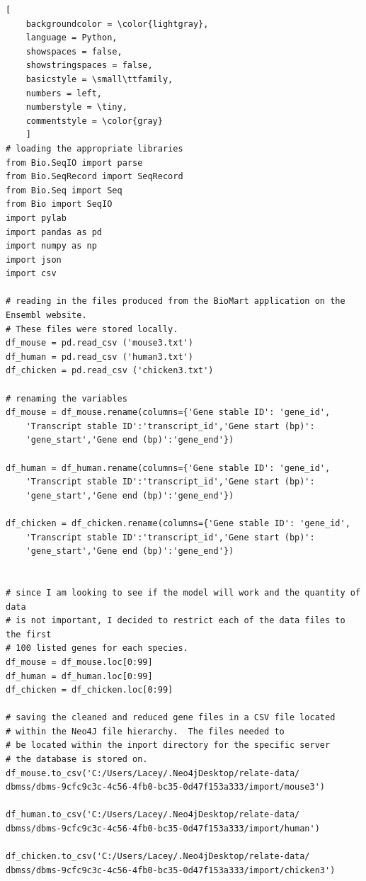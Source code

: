 \documentclass[]{article}
\begin{document}
\begin{lstlisting}[
	backgroundcolor = \color{lightgray},
	language = Python,
	showspaces = false,
	showstringspaces = false,
	basicstyle = \small\ttfamily,
	numbers = left,
	numberstyle = \tiny,
	commentstyle = \color{gray}
	]
# loading the appropriate libraries
from Bio.SeqIO import parse 
from Bio.SeqRecord import SeqRecord 
from Bio.Seq import Seq 
from Bio import SeqIO
import pylab
import pandas as pd
import numpy as np
import json
import csv 

# reading in the files produced from the BioMart application on the Ensembl website.
# These files were stored locally.
df_mouse = pd.read_csv ('mouse3.txt')
df_human = pd.read_csv ('human3.txt')
df_chicken = pd.read_csv ('chicken3.txt')

# renaming the variables 
df_mouse = df_mouse.rename(columns={'Gene stable ID': 'gene_id', 
	'Transcript stable ID':'transcript_id','Gene start (bp)':
	'gene_start','Gene end (bp)':'gene_end'})

df_human = df_human.rename(columns={'Gene stable ID': 'gene_id', 
	'Transcript stable ID':'transcript_id','Gene start (bp)':
	'gene_start','Gene end (bp)':'gene_end'})

df_chicken = df_chicken.rename(columns={'Gene stable ID': 'gene_id', 
	'Transcript stable ID':'transcript_id','Gene start (bp)':
	'gene_start','Gene end (bp)':'gene_end'})


# since I am looking to see if the model will work and the quantity of data 
# is not important, I decided to restrict each of the data files to the first
# 100 listed genes for each species.
df_mouse = df_mouse.loc[0:99]
df_human = df_human.loc[0:99]
df_chicken = df_chicken.loc[0:99]

# saving the cleaned and reduced gene files in a CSV file located
# within the Neo4J file hierarchy.  The files needed to
# be located within the inport directory for the specific server
# the database is stored on.
df_mouse.to_csv('C:/Users/Lacey/.Neo4jDesktop/relate-data/
dbmss/dbms-9cfc9c3c-4c56-4fb0-bc35-0d47f153a333/import/mouse3')

df_human.to_csv('C:/Users/Lacey/.Neo4jDesktop/relate-data/
dbmss/dbms-9cfc9c3c-4c56-4fb0-bc35-0d47f153a333/import/human')

df_chicken.to_csv('C:/Users/Lacey/.Neo4jDesktop/relate-data/
dbmss/dbms-9cfc9c3c-4c56-4fb0-bc35-0d47f153a333/import/chicken3')

\end{lstlisting}
\end{document}
